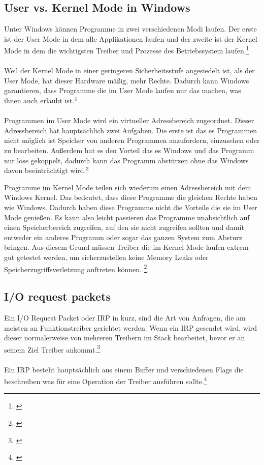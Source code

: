 \subsection{User vs. Kernel Mode in Windows}
Unter Windows können Programme in zwei verschiedenen Modi laufen. Der erste ist der User Mode in dem alle Applikationen laufen und der zweite ist der Kernel Mode in dem die wichtigsten Treiber und Prozesse des Betriebssystem laufen.\footnote[3]{\cite[Vgl.][]{21}}
\\\\
Weil der Kernel Mode in einer geringeren Sicherheitsstufe angesiedelt ist, als der User Mode, hat dieser Hardware mäßig, mehr Rechte. Dadurch kann Windows garantieren, dass Programme die im User Mode laufen nur das machen, was ihnen auch erlaubt ist.$^{3}$
\\\\
Programmen im User Mode wird ein virtueller Adressbereich zugeordnet. Dieser Adressbereich hat hauptsächlich zwei Aufgaben. Die erste ist das es Programmen nicht möglich ist Speicher von anderen Programmen anzufordern, einzusehen oder zu bearbeiten. Außerdem hat es den Vorteil das es Windows und das Programm nur lose gekoppelt, dadurch kann das Programm abstürzen ohne das Windows davon beeinträchtigt wird.$^{3}$

\newpage

Programme im Kernel Mode teilen sich wiederum einen Adressbereich mit dem Windows Kernel. Das bedeutet, dass diese Programme die gleichen Rechte haben wie Windows. Dadurch haben diese Programme nicht die Vorteile die sie im User Mode genießen. Es kann also leicht passieren das Programme unabsichtlich auf einen Speicherbereich zugreifen, auf den sie nicht zugreifen sollten und damit entweder ein anderes Programm oder sogar das ganzen System zum Absturz bringen. Aus diesem Grund müssen Treiber die im Kernel Mode laufen extrem gut getestet werden, um sicherzustellen keine Memory Leaks oder Speicherzugriffsverletzung auftreten können. \footnote[1]{\cite[Vgl.][]{21}}

\subsection{I/O request packets}
Ein I/O Request Packet oder IRP in kurz, sind die Art von Anfragen, die am meisten an Funktionstreiber gerichtet werden. Wenn ein IRP gesendet wird, wird dieser normalerweise von mehreren Treibern im Stack bearbeitet, bevor er an seinem Ziel Treiber ankommt.\footnote[2]{\cite[Vgl.][]{23}}
\\\\
Ein IRP besteht hauptsächlich aus einem Buffer und verschiedenen Flags die beschreiben was für eine Operation der Treiber ausführen sollte.\footnote[3]{\cite[Vgl.][]{22}}

